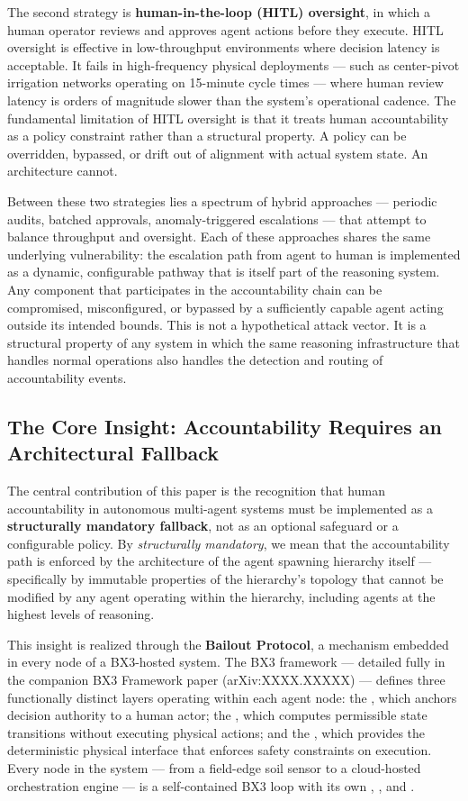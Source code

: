 The second strategy is \textbf{human-in-the-loop (HITL) oversight}, in which a human operator reviews and approves agent actions before they execute. HITL oversight is effective in low-throughput environments where decision latency is acceptable. It fails in high-frequency physical deployments — such as center-pivot irrigation networks operating on 15-minute cycle times — where human review latency is orders of magnitude slower than the system's operational cadence. The fundamental limitation of HITL oversight is that it treats human accountability as a policy constraint rather than a structural property. A policy can be overridden, bypassed, or drift out of alignment with actual system state. An architecture cannot.

Between these two strategies lies a spectrum of hybrid approaches — periodic audits, batched approvals, anomaly-triggered escalations — that attempt to balance throughput and oversight. Each of these approaches shares the same underlying vulnerability: the escalation path from agent to human is implemented as a dynamic, configurable pathway that is itself part of the reasoning system. Any component that participates in the accountability chain can be compromised, misconfigured, or bypassed by a sufficiently capable agent acting outside its intended bounds. This is not a hypothetical attack vector. It is a structural property of any system in which the same reasoning infrastructure that handles normal operations also handles the detection and routing of accountability events.

\subsection{The Core Insight: Accountability Requires an Architectural Fallback}

The central contribution of this paper is the recognition that human accountability in autonomous multi-agent systems must be implemented as a \textbf{structurally mandatory fallback}, not as an optional safeguard or a configurable policy. By \textit{structurally mandatory}, we mean that the accountability path is enforced by the architecture of the agent spawning hierarchy itself — specifically by immutable properties of the hierarchy's topology that cannot be modified by any agent operating within the hierarchy, including agents at the highest levels of reasoning.

This insight is realized through the \textbf{Bailout Protocol}, a mechanism embedded in every node of a BX3-hosted system. The BX3 framework — detailed fully in the companion BX3 Framework paper (arXiv:XXXX.XXXXX) — defines three functionally distinct layers operating within each agent node: the \purpose, which anchors decision authority to a human actor; the \bounds, which computes permissible state transitions without executing physical actions; and the \fact, which provides the deterministic physical interface that enforces safety constraints on execution. Every node in the system — from a field-edge soil sensor to a cloud-hosted orchestration engine — is a self-contained BX3 loop with its own \purpose, \bounds, and \fact.

